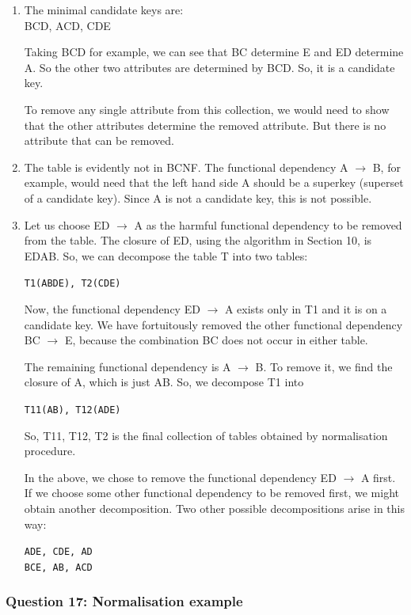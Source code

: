 \begin{enumerate}[label=\alph*.]
  \item The minimal candidate keys are:\\
  BCD, ACD, CDE

  Taking BCD for example, we can see that BC determine E and ED determine A. So the other two
  attributes are determined by BCD. So, it is a candidate key.

  To remove any single attribute from this collection, we would need to show that the other attributes determine
  the removed attribute. But there is no attribute that can be removed.

  \item The table is evidently not in BCNF. The functional dependency A $\rightarrow$ B, for example, would need that the
  left hand side A should be a superkey (superset of a candidate key). Since A is not a candidate key, this is
  not possible.

  \item Let us choose ED $\rightarrow$ A as the harmful functional dependency to be removed from the table. The closure of
  ED, using the algorithm in Section 10, is EDAB. So, we can decompose the table T into two tables:

  \texttt{T1(ABDE), T2(CDE)}

  Now, the functional dependency ED $\rightarrow$ A exists only in T1 and it is on a candidate key. We have fortuitously
  removed the other functional dependency BC $\rightarrow$ E, because the combination BC does not occur in either
  table.

  The remaining functional dependency is A $\rightarrow$ B. To remove it, we find the closure of A, which is just AB.
  So, we decompose T1 into

  \texttt{T11(AB), T12(ADE)}

  So, T11, T12, T2 is the final collection of tables obtained by normalisation procedure.

  In the above, we chose to remove the functional dependency ED $\rightarrow$ A first. If we choose some other
  functional dependency to be removed first, we might obtain another decomposition. Two other possible
  decompositions arise in this way:

  \texttt{ADE, CDE, AD}\\
  \texttt{BCE, AB, ACD}
\end{enumerate}
\subsubsection{Question 17: Normalisation example}

